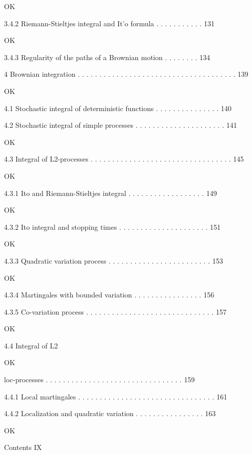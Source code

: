 OK

3.4.2 Riemann-Stieltjes integral and It'o formula . . . . . . . . . . . 131

OK

3.4.3 Regularity of the paths of a Brownian motion . . . . . . . . 134



4 Brownian integration . . . . . . . . . . . . . . . . . . . . . . . . . . . . . . . . . . . . . 139

OK

4.1 Stochastic integral of deterministic functions . . . . . . . . . . . . . . . 140



4.2 Stochastic integral of simple processes . . . . . . . . . . . . . . . . . . . . . 141

OK

4.3 Integral of L2-processes . . . . . . . . . . . . . . . . . . . . . . . . . . . . . . . . . 145

OK

4.3.1 Ito and Riemann-Stieltjes integral . . . . . . . . . . . . . . . . . . 149

OK

4.3.2 Ito integral and stopping times . . . . . . . . . . . . . . . . . . . . . 151

OK

4.3.3 Quadratic variation process . . . . . . . . . . . . . . . . . . . . . . . . 153

OK

4.3.4 Martingales with bounded variation . . . . . . . . . . . . . . . . 156



4.3.5 Co-variation process . . . . . . . . . . . . . . . . . . . . . . . . . . . . . . 157

OK

4.4 Integral of L2

OK

loc-processes . . . . . . . . . . . . . . . . . . . . . . . . . . . . . . . . 159



4.4.1 Local martingales . . . . . . . . . . . . . . . . . . . . . . . . . . . . . . . . 161



4.4.2 Localization and quadratic variation . . . . . . . . . . . . . . . . 163

OK

Contents IX



